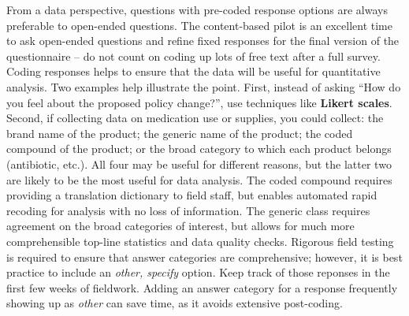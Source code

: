 From a data perspective, questions with pre-coded response options
are always preferable to open-ended questions.
The content-based pilot is an excellent time to ask open-ended questions
and refine fixed responses for the final version of the questionnaire --
do not count on coding up lots of free text after a full survey.
Coding responses helps to ensure that the data will be useful for quantitative analysis.
Two examples help illustrate the point.
First, instead of asking ``How do you feel about the proposed policy change?'',
use techniques like \textbf{Likert scales}.
Second, if collecting data on medication use or supplies, you could collect:
the brand name of the product; the generic name of the product; the coded compound of the product;
or the broad category to which each product belongs (antibiotic, etc.).
All four may be useful for different reasons,
but the latter two are likely to be the most useful for data analysis.
The coded compound requires providing a translation dictionary to field staff,
but enables automated rapid recoding for analysis with no loss of information.
The generic class requires agreement on the broad categories of interest,
but allows for much more comprehensible top-line statistics and data quality checks.
Rigorous field testing is required to ensure that answer categories are comprehensive;
however, it is best practice to include an \textit{other, specify} option.
Keep track of those reponses in the first few weeks of fieldwork.
Adding an answer category for a response frequently showing up as \textit{other} can save time,
as it avoids extensive post-coding.

